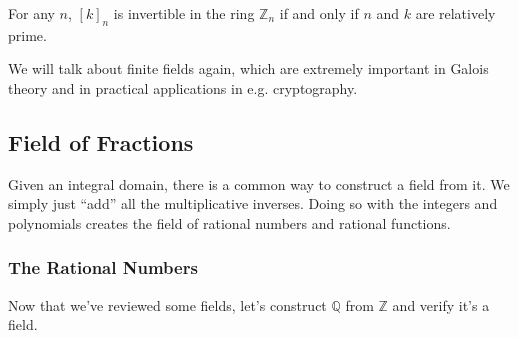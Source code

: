   \begin{corollary}
    For any $n$, $[k]_n$ is invertible in the ring $\mathbb{Z}_n$ if and only if $n$ and $k$ are relatively prime. 
  \end{corollary} 

  We will talk about finite fields again, which are extremely important in Galois theory and in practical applications in e.g. cryptography. 

\subsection{Field of Fractions}

  Given an integral domain, there is a common way to construct a field from it. We simply just ``add'' all the multiplicative inverses. Doing so with the integers and polynomials creates the field of rational numbers and rational functions. 

\subsubsection{The Rational Numbers}

  Now that we've reviewed some fields, let's construct $\mathbb{Q}$ from $\mathbb{Z}$ and verify it's a field. 

